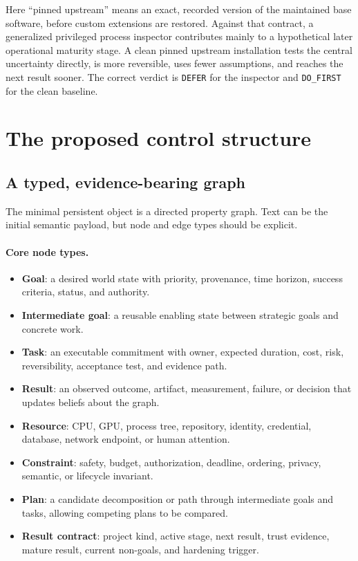 \documentclass[11pt,letterpaper]{article}
\newcommand{\term}[1]{\textbf{#1}}
\newcommand{\verdict}[1]{\texttt{#1}}
\begin{document}
Here ``pinned upstream'' means an exact, recorded version of the maintained
base software, before custom extensions are restored. Against that contract,
a generalized privileged process inspector contributes mainly
to a hypothetical later operational maturity stage. A clean pinned upstream
installation tests the central uncertainty directly, is more reversible, uses
fewer assumptions, and reaches the next result sooner. The correct verdict is
\verdict{DEFER} for the inspector and \verdict{DO\_FIRST} for the clean
baseline.

\section{The proposed control structure}

\subsection{A typed, evidence-bearing graph}

The minimal persistent object is a directed property graph. Text can be the
initial semantic payload, but node and edge types should be explicit.

\paragraph{Core node types.}
\begin{itemize}
  \item \term{Goal}: a desired world state with priority, provenance, time
        horizon, success criteria, status, and authority.
  \item \term{Intermediate goal}: a reusable enabling state between strategic
        goals and concrete work.
  \item \term{Task}: an executable commitment with owner, expected duration,
        cost, risk, reversibility, acceptance test, and evidence path.
  \item \term{Result}: an observed outcome, artifact, measurement, failure, or
        decision that updates beliefs about the graph.
  \item \term{Resource}: CPU, GPU, process tree, repository, identity,
        credential, database, network endpoint, or human attention.
  \item \term{Constraint}: safety, budget, authorization, deadline, ordering,
        privacy, semantic, or lifecycle invariant.
  \item \term{Plan}: a candidate decomposition or path through intermediate
        goals and tasks, allowing competing plans to be compared.
  \item \term{Result contract}: project kind, active stage, next result, trust
        evidence, mature result, current non-goals, and hardening trigger.
\end{itemize}
\end{document}
